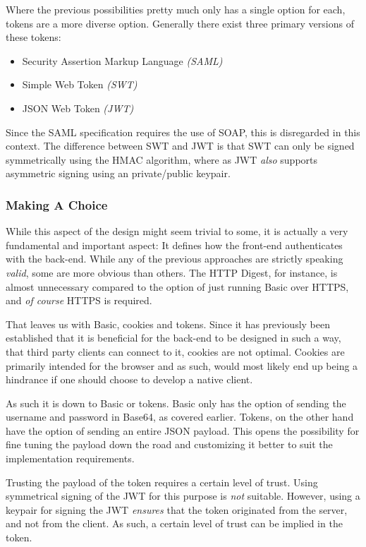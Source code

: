 				Where the previous possibilities pretty much only has a single option for each, tokens are a more diverse option. Generally there exist three primary versions of these tokens:
				\begin{itemize}
					\item Security Assertion Markup Language \emph{(SAML)}
					\item Simple Web Token \emph{(SWT)}
					\item JSON Web Token \emph{(JWT)}
				\end{itemize}
				Since the SAML specification requires the use of SOAP, this is disregarded in this context. The difference between SWT and JWT is that SWT can only be signed symmetrically using the HMAC algorithm, where as JWT \emph{also} supports asymmetric signing using an private/public keypair\cite{auth0_jwt}.

			\subsubsection{Making A Choice}
				While this aspect of the design might seem trivial to some, it is actually a very fundamental and important aspect: It defines how the front-end authenticates with the back-end. While any of the previous approaches are strictly speaking \emph{valid}, some are more obvious than others. The HTTP Digest, for instance, is almost unnecessary compared to the option of just running Basic over HTTPS, and \emph{of course} HTTPS is required.

				That leaves us with Basic, cookies and tokens. Since it has previously been established that it is beneficial for the back-end to be designed in such a way, that third party clients can connect to it, cookies are not optimal. Cookies are primarily intended for the browser and as such, would most likely end up being a hindrance if one should choose to develop a native client.

				As such it is down to Basic or tokens. Basic only has the option of sending the username and password in Base64, as covered earlier. Tokens, on the other hand have the option of sending an entire JSON payload. This opens the possibility for fine tuning the payload down the road and customizing it better to suit the implementation requirements. 

				Trusting the payload of the token requires a certain level of trust. Using symmetrical signing of the JWT for this purpose is \emph{not} suitable. However, using a keypair for signing the JWT \emph{ensures} that the token originated from the server, and not from the client. As such, a certain level of trust can be implied in the token.

